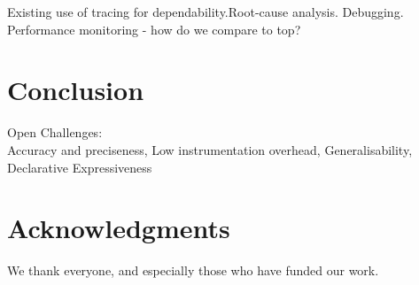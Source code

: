 \documentclass[letterpaper,twocolumn,10pt]{article}
\begin{document}
Existing use of tracing for dependability.\newline Root-cause analysis.
Debugging. Performance monitoring - how do we compare to top?

\section{Conclusion} Open Challenges:\\ Accuracy and preciseness, Low
instrumentation overhead, Generalisability, Declarative Expressiveness

\section{Acknowledgments}

We thank everyone, and especially those who have funded our work.

{\footnotesize  }
\end{document}
